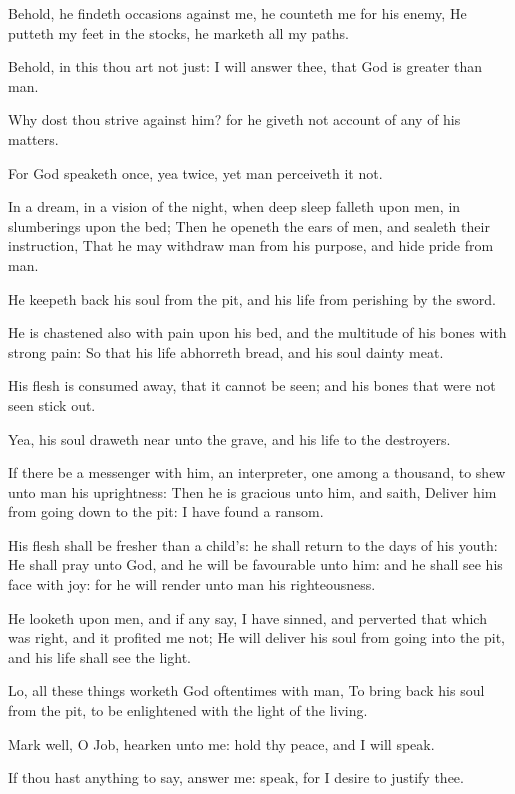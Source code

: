 \Verse Behold, he findeth occasions against me, he counteth me for his enemy, \Verse He putteth my feet in the stocks, he marketh all my paths.

\Verse Behold, in this thou art not just: I will answer thee, that God is greater than man.

\Verse Why dost thou strive against him? for he giveth not account of any of his matters.

\Verse For God speaketh once, yea twice, yet man perceiveth it not.

\Verse In a dream, in a vision of the night, when deep sleep falleth upon men, in slumberings upon the bed; \Verse Then he openeth the ears of men, and sealeth their instruction, \Verse That he may withdraw man from his purpose, and hide pride from man.

\Verse He keepeth back his soul from the pit, and his life from perishing by the sword.

\Verse He is chastened also with pain upon his bed, and the multitude of his bones with strong pain: \Verse So that his life abhorreth bread, and his soul dainty meat.

\Verse His flesh is consumed away, that it cannot be seen; and his bones that were not seen stick out.

\Verse Yea, his soul draweth near unto the grave, and his life to the destroyers.

\Verse If there be a messenger with him, an interpreter, one among a thousand, to shew unto man his uprightness: \Verse Then he is gracious unto him, and saith, Deliver him from going down to the pit: I have found a ransom.

\Verse His flesh shall be fresher than a child's: he shall return to the days of his youth: \Verse He shall pray unto God, and he will be favourable unto him: and he shall see his face with joy: for he will render unto man his righteousness.

\Verse He looketh upon men, and if any say, I have sinned, and perverted that which was right, and it profited me not; \Verse He will deliver his soul from going into the pit, and his life shall see the light.

\Verse Lo, all these things worketh God oftentimes with man, \Verse To bring back his soul from the pit, to be enlightened with the light of the living.

\Verse Mark well, O Job, hearken unto me: hold thy peace, and I will speak.

\Verse If thou hast anything to say, answer me: speak, for I desire to justify thee.

